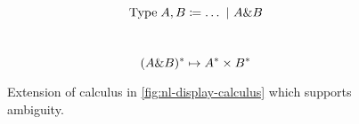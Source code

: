 \begin{figure}[h]
  \begin{mdframed}
    \centering
    \[\text{Type}\;A,B\coloneqq\ldots\vsep A\& B\]
    \begin{pfbox}
    \end{pfbox}
    \begin{pfbox}
    \end{pfbox}
    \begin{pfbox}
    \end{pfbox}
    \\[1\baselineskip]
    \hrulefill
    \[
      \tr[(A\& B)] \mapsto \tr[A]\times\tr[B]
    \]
    \begin{pfblock}
    \end{pfblock}
    \begin{pfblock}
    \end{pfblock}
    \begin{pfblock}
    \end{pfblock}
    \vspace*{0.5\baselineskip}
  \end{mdframed}
  \caption{
    Extension of calculus in \autoref{fig:nl-display-calculus} which supports ambiguity.}%
  \label{fig:extension-lexical-ambiguity}
\end{figure}

